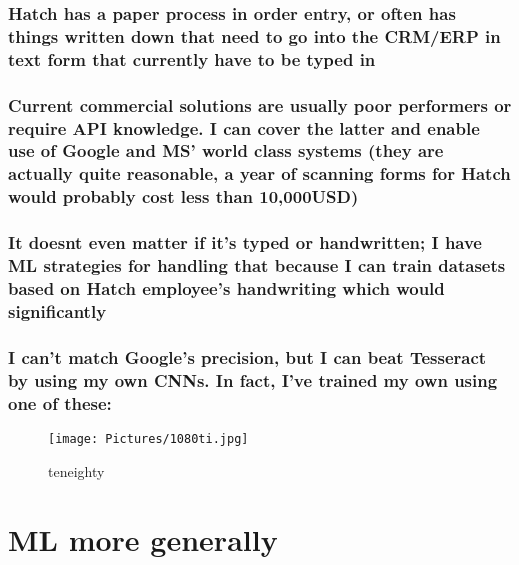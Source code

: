\documentclass[11pt]{article}
\makeatletter
\def\maxwidth{\ifdim\Gin@nat@width>\linewidth\linewidth
    \else\Gin@nat@width\fi}
\let\Oldincludegraphics\includegraphics
\renewcommand{\includegraphics}[1]{\Oldincludegraphics[width=.8\maxwidth]{#1}}
\makeatother
\begin{document}
\subsubsection{Hatch has a paper process in order entry, or often has
things written down that need to go into the CRM/ERP in text form that
currently have to be typed
in}\label{hatch-has-a-paper-process-in-order-entry-or-often-has-things-written-down-that-need-to-go-into-the-crmerp-in-text-form-that-currently-have-to-be-typed-in}

\subsubsection{Current commercial solutions are usually poor performers
or require API knowledge. I can cover the latter and enable use of
Google and MS' world class systems (they are actually quite reasonable,
a year of scanning forms for Hatch would probably cost less than
10,000USD)}\label{current-commercial-solutions-are-usually-poor-performers-or-require-api-knowledge.-i-can-cover-the-latter-and-enable-use-of-google-and-ms-world-class-systems-they-are-actually-quite-reasonable-a-year-of-scanning-forms-for-hatch-would-probably-cost-less-than-10000usd}

\subsubsection{It doesnt even matter if it's typed or handwritten; I
have ML strategies for handling that because I can train datasets based
on Hatch employee's handwriting which would
significantly}\label{it-doesnt-even-matter-if-its-typed-or-handwritten-i-have-ml-strategies-for-handling-that-because-i-can-train-datasets-based-on-hatch-employees-handwriting-which-would-significantly}

\subsubsection{I can't match Google's precision, but I can beat
Tesseract by using my own CNNs. In fact, I've trained my own using one
of
these:}\label{i-cant-match-googles-precision-but-i-can-beat-tesseract-by-using-my-own-cnns.-in-fact-ive-trained-my-own-using-one-of-these}

\begin{figure}
\centering
\texttt{[image: Pictures/1080ti.jpg]}
\caption{teneighty}
\end{figure}

    \section{ML more generally}\label{ml-more-generally}
\end{document}
